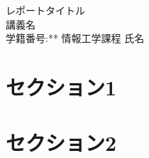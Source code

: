 \documentclass[a4paper,11pt]{jsarticle}
\begin{document}
\begin{center}
{\huge レポートタイトル}\\ %
{\Large 講義名}\\ %
{\large 学籍番号:** 情報工学課程 氏名}\\ %
\end{center}

\section{セクション1}
\section{セクション2}
\end{document}
